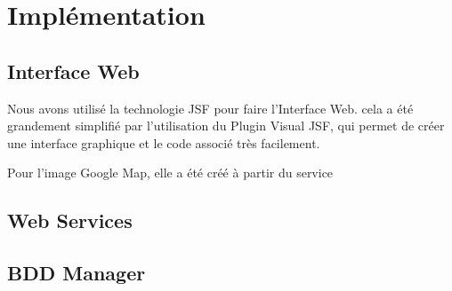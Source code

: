 \chapter{Implémentation}

\section{Interface Web}

Nous avons utilisé la technologie JSF pour faire l'Interface Web. cela a été
grandement simplifié par l'utilisation du Plugin Visual JSF, qui permet de créer
une interface graphique et le code associé très facilement.

Pour l'image Google Map, elle a été créé à partir du service 

\section{Web Services}

\section{BDD Manager}

\clearpage




















